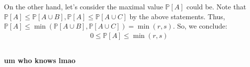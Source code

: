 \documentclass{article}
\newcommand{\how}[1]{\colorbox{BurntOrange}{\textbf{#1}}}
\begin{document}
On the other hand, let's consider the maximal value $\mathbb{P}[A]$ could be. Note that $\mathbb{P}[A] \leq \mathbb{P}[A \cup B], \mathbb{P}[A] \leq \mathbb{P}[A \cup C]$ by the above statements. Thus, $\mathbb{P}[A] \leq \min(\mathbb{P}[A \cup B], \mathbb{P}[A \cup C]) = \min(r, s)$. So, we conclude:
\begin{align}
    0 \leq \mathbb{P}[A] \leq \min(r, s)
\end{align}

\subsection{}
\how{um who knows lmao}

\newpage %
\section{}
\subsection{}

\subsection{}

\subsection{}

\subsection{}

\subsection{}

\subsection{}

\subsection{}

\newpage %
\section{}
\end{document}

